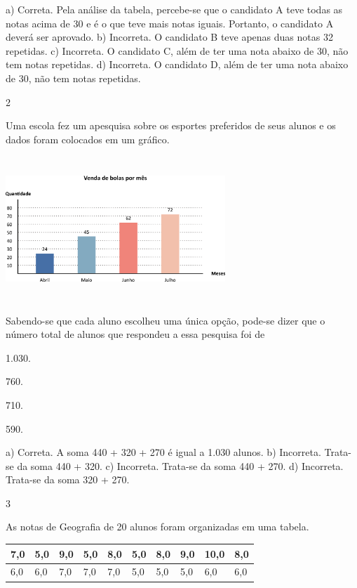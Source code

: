 \begin{escolha}
{\begin{escolha}
{a) Correta. Pela análise da tabela, percebe-se que o candidato A teve todas as notas
acima de 30 e é o que teve mais notas iguais. Portanto, o candidato A
deverá ser aprovado.
b) Incorreta. O candidato B teve apenas duas notas 32 repetidas.
c) Incorreta. O candidato C, além de ter uma nota abaixo de 30, não tem notas repetidas.
d) Incorreta. O candidato D, além de ter uma nota abaixo de 30, não tem notas repetidas.

\num{2}

Uma escola fez um apesquisa sobre os esportes preferidos de seus alunos
e os dados foram colocados em um gráfico.


\includegraphics[width=3.25862in,height=2.14185in]{media/image105.png}

Sabendo-se que cada aluno escolheu uma única opção, pode-se dizer que o
número total de alunos que respondeu a essa pesquisa foi de

\begin{escolha}
\item
  1.030.
\item
  760.
\item
  710.
\item
  590.
\end{escolha}

a) Correta.  A soma 440 + 320 + 270 é igual a 1.030 alunos.
b) Incorreta. Trata-se da soma 440 + 320.
c) Incorreta. Trata-se da soma 440 + 270.
d) Incorreta. Trata-se da soma 320 + 270.

\num{3}

As notas de Geografia de 20 alunos foram organizadas em uma tabela.

\begin{longtable}[]{@{}llllllllll@{}}
\toprule
7,0 & 5,0 & 9,0 & 5,0 & 8,0 & 5,0 & 8,0 & 9,0 & 10,0 &
8,0\tabularnewline
\midrule
\endhead
6,0 & 6,0 & 7,0 & 7,0 & 7,0 & 5,0 & 5,0 & 5,0 & 6,0 & 6,0\tabularnewline
\bottomrule
\end{longtable}

}
\end{escolha}}
\end{escolha}
